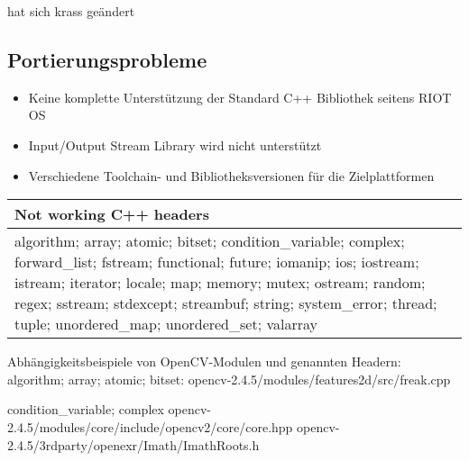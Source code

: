 \documentclass[10pt,a4paper]{article}
\begin{document}
hat sich krass geändert

\subsection{Portierungsprobleme}

\begin{itemize}
\item Keine komplette Unterstützung der Standard C++ Bibliothek seitens RIOT OS
\item Input/Output Stream Library wird nicht unterstützt
\item Verschiedene Toolchain- und Bibliotheksversionen für die Zielplattformen
\end{itemize}


\begin{center}
  \begin{tabular}{ | p{10cm} | }
    \hline
    Not working C++ headers \\ \hline

algorithm; array; atomic; bitset; condition\_variable; complex; \newline
forward\_list; fstream; functional; future; iomanip; ios; iostream; \newline 
istream; iterator; locale; map; memory; mutex; ostream; random; \newline
regex; sstream; stdexcept; streambuf; string; system\_error; \newline
thread; tuple; unordered\_map; unordered\_set; valarray \\

    \hline
  \end{tabular}
\end{center}

Abhängigkeitsbeispiele von OpenCV-Modulen und genannten Headern: \\

algorithm; array; atomic; bitset: \newline
opencv-2.4.5/modules/features2d/src/freak.cpp \newline

condition\_variable; complex \newline
opencv-2.4.5/modules/core/include/opencv2/core/core.hpp \newline
opencv-2.4.5/3rdparty/openexr/Imath/ImathRoots.h \newline
\end{document}
